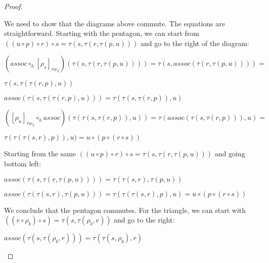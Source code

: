 \documentclass[12pt, a4paper,  oneside, headinclude,footinclude, BCOR5mm]{scrartcl}
\begin{document}
\begin{proof}
\begin{center}
\end{center}

We need to show that the diagrams above commute. The equations are straightforward. Starting with the pentagon, we can start from $((u\circ p) \circ r) \circ s = \tau(s,\tau(r,\tau(p,u)))$ and go to the right of the diagram:

\begin{center}
$(assoc \circ_{h} [\rho_{s}]_{rw_{2}})(\tau(s,\tau(r,\tau(p,u)))) = \tau(s,assoc(\tau(r,\tau(p,u)))) =$

$\tau(s,\tau(\tau(r,p),u))$

$assoc(\tau(s,\tau(\tau(r,p),u))) = \tau(\tau(s,\tau(r,p)),u)$

$([\rho_{u}]_{rw_{2}} \circ_{h} assoc)(\tau(\tau(s,\tau(r,p)),u)) = \tau(assoc(\tau(s,\tau(r,p))), u) = $

$\tau(\tau(\tau(s,r),p)), u) = u \circ (p \circ (r \circ s))$
\end{center}

Starting from the same $((u\circ p) \circ r) \circ s = \tau(s,\tau(r,\tau(p,u)))$ and going bottom left:

\begin{center}
$assoc(\tau(s,\tau(r,\tau(p,u)))) = \tau(\tau(s,r),\tau(p,u))$

$assoc(\tau(\tau(s,r),\tau(p,u))) = \tau(\tau(\tau(s,r),p),u) = u \circ (p \circ (r \circ s))$
\end{center}

We conclude that the pentagon commutes. For the triangle, we can start with $((r \circ \rho_{b}) \circ s) = \tau(s,\tau(\rho_{b},r))$ and go to the right:

\begin{center}
$assoc(\tau(s,\tau(\rho_{b},r))) = \tau(\tau(s,\rho_{b}),r)$


\end{center}
\end{proof}
\end{document}
